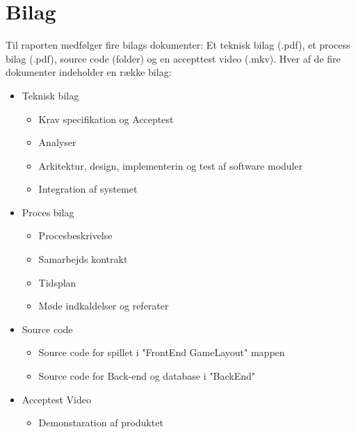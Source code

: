 \section{Bilag}

Til raporten medfølger fire bilags dokumenter: Et teknisk bilag (.pdf), et process bilag (.pdf), source code (folder) og en accepttest video (.mkv). Hver af de fire dokumenter indeholder en række bilag:

\begin{itemize}
\item Teknisk bilag
	\begin{itemize}
	\item Krav specifikation og Acceptest
	\item Analyser
	\item Arkitektur, design, implementerin og test af software moduler
	\item Integration af systemet
	\end{itemize}

\item Proces bilag
	\begin{itemize}
	\item Procesbeskrivelse
	\item Samarbejds kontrakt
	\item Tidsplan
	\item Møde indkaldelser og referater
	\end{itemize}

\item Source code
	\begin{itemize}
	\item Source code for spillet i "FrontEnd GameLayout" mappen
	\item Source code for Back-end og database i "BackEnd"
	\end{itemize}

\item Acceptest Video
	\begin{itemize}
	\item Demonstaration af produktet
	\end{itemize}
\end{itemize}